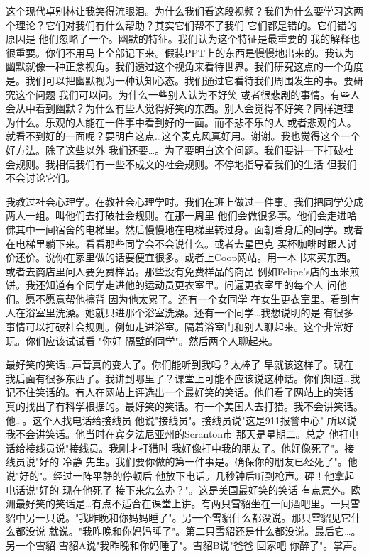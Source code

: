 这个现代卓别林让我笑得流眼泪。为什么我们看这段视频？我们为什么要学习这两个理论？它们对我们有什么帮助？其实它们帮不了我们 它们都是错的。它们错的原因是 他们忽略了一个。幽默的特征。我们认为这个特征是最重要的 我的解释也很重要。你们不用马上全部记下来。假装PPT上的东西是慢慢地出来的。我认为幽默就像一种正念视角。我们透过这个视角来看待世界。我们研究这点的一个角度是。我们可以把幽默视为一种认知心态。我们通过它看待我们周围发生的事。要研究这个问题 我们可以问。为什么一些别人认为不好笑 或者很悲剧的事情。有些人会从中看到幽默？为什么有些人觉得好笑的东西。别人会觉得不好笑？同样道理 为什么。乐观的人能在一件事中看到好的一面。而不悲不乐的人 或者悲观的人。就看不到好的一面呢？要明白这点…这个麦克风真好用。谢谢。我也觉得这个一个好方法。除了这些以外 我们还要…。为了要明白这个问题。我们要讲一下打破社会规则。我相信我们有一些不成文的社会规则。不停地指导着我们的生活 但我们不会讨论它们。 

我教过社会心理学。在教社会心理学时。我们在班上做过一件事。我们把同学分成两人一组。叫他们去打破社会规则。在那一周里 他们会做很多事。他们会走进哈佛其中一间宿舍的电梯里。然后慢慢地在电梯里转过身。面朝着身后的同学。或者在电梯里躺下来。看看那些同学会不会说什么。或者去星巴克 买杯咖啡时跟人讨价还价。说你在家里做的话要便宜很多。或者上Coop网站。用一本书来买东西。或者去商店里问人要免费样品。那些没有免费样品的商品 例如Felipe's店的玉米煎饼。我还知道有个同学走进他的运动员更衣室里。问遍更衣室里的每个人 问他们。愿不愿意帮他擦背 因为他太累了。还有一个女同学 在女生更衣室里。看到有人在浴室里洗澡。她就只进那个浴室洗澡。还有一个同学…我想说明的是 有很多事情可以打破社会规则。例如走进浴室。隔着浴室门和别人聊起来。这个非常好玩。你们应该试试看 "你好 隔壁的同学"。然后两个人聊起来。 

最好笑的笑话…声音真的变大了。你们能听到我吗？太棒了 早就该这样了。现在我后面有很多东西了。我讲到哪里了？课堂上可能不应该说这种话。你们知道…我记不住笑话的。有人在网站上评选出一个最好笑的笑话。他们看了网站上的笑话 真的找出了有科学根据的。最好笑的笑话。有一个美国人去打猎。我不会讲笑话。他…。这个人找电话给接线员 他说"接线员"。接线员说"这是911报警中心" 所以说我不会讲笑话。他当时在宾夕法尼亚州的Scranton市 那天是星期二。总之 他打电话给接线员说"接线员。我刚才打猎时 我好像打中我的朋友了。他好像死了"。接线员说"好的 冷静 先生。我们要你做的第一件事是。确保你的朋友已经死了"。他说"好的"。经过一阵平静的停顿后 他放下电话。几秒钟后听到枪声。砰！他拿起电话说"好的 现在他死了 接下来怎么办？"。这是美国最好笑的笑话 有点意外。欧洲最好笑的笑话是…有点不适合在课堂上讲。有两只雪貂坐在一间酒吧里。一只雪貂中另一只说。"我昨晚和你妈妈睡了"。另一个雪貂什么都没说。那只雪貂见它什么都没说 就说。"我昨晚和你妈妈睡了"。第二只雪貂还是什么都没说。最后它…。另一个雪貂 雪貂A说"我昨晚和你妈睡了"。雪貂B说"爸爸 回家吧 你醉了"。掌声。 


